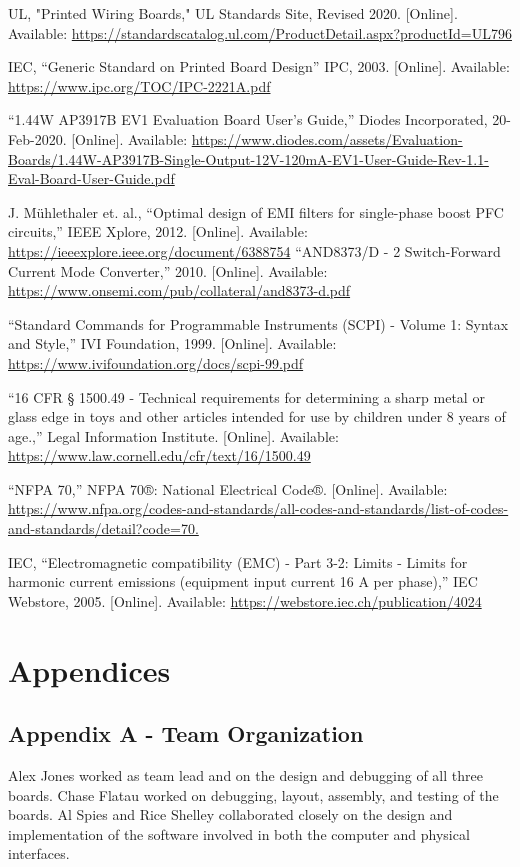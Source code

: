\documentclass[15pt]{article}
\begin{document}
\begin{thebibliography}{}
     UL, "Printed Wiring Boards," UL Standards Site, Revised 2020. [Online]. Available: \url{https://standardscatalog.ul.com/ProductDetail.aspx?productId=UL796}

    IEC, “Generic Standard on Printed Board Design” IPC, 2003. [Online]. Available: \url{https://www.ipc.org/TOC/IPC-2221A.pdf}

    “1.44W AP3917B EV1 Evaluation Board User’s Guide,” Diodes Incorporated, 20-Feb-2020. [Online]. Available: \url{https://www.diodes.com/assets/Evaluation-Boards/1.44W-AP3917B-Single-Output-12V-120mA-EV1-User-Guide-Rev-1.1-Eval-Board-User-Guide.pdf}

    J. Mühlethaler et. al., “Optimal design of EMI filters for single-phase boost PFC circuits,” IEEE Xplore, 2012. [Online]. Available: 
    \url{https://ieeexplore.ieee.org/document/6388754}
    “AND8373/D - 2 Switch-Forward Current Mode Converter,” 2010. [Online]. Available: \url{https://www.onsemi.com/pub/collateral/and8373-d.pdf}

    “Standard Commands for Programmable Instruments (SCPI) - Volume 1: Syntax and Style,” IVI Foundation, 1999. [Online]. Available: \url{https://www.ivifoundation.org/docs/scpi-99.pdf}

    “16 CFR § 1500.49 - Technical requirements for determining a sharp metal or glass edge in toys and other articles intended for use by children under 8 years of age.,” Legal Information Institute. [Online]. Available: \url{https://www.law.cornell.edu/cfr/text/16/1500.49}
    
    “NFPA 70,” NFPA 70®: National Electrical Code®. [Online]. Available: \url{https://www.nfpa.org/codes-and-standards/all-codes-and-standards/list-of-codes-and-standards/detail?code=70.} 
    
    IEC, “Electromagnetic compatibility (EMC) - Part 3-2: Limits - Limits for harmonic current emissions (equipment input current 16 A per phase),” IEC Webstore, 2005. [Online]. Available:
    \url{https://webstore.iec.ch/publication/4024}
\end{thebibliography}
\endgroup
\pagebreak
\section{Appendices}
\subsection{Appendix A - Team Organization}
Alex Jones worked as team lead and on the design and debugging of all three boards. Chase Flatau worked on debugging, layout, assembly, and testing of the boards. Al Spies and Rice Shelley collaborated closely on the design and implementation of the software involved in both the computer and physical interfaces.
\end{document}
